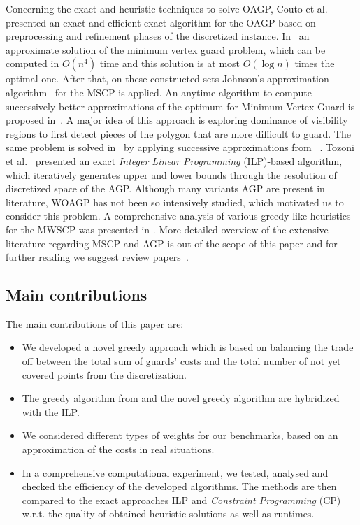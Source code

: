 \documentclass[runningheads,a4paper]{elsarticle}
\begin{document}
	Concerning the exact and heuristic techniques to solve OAGP, Couto et al.~\cite{couto2007exact} presented an exact and efficient exact algorithm for the OAGP based on preprocessing and refinement phases of the discretized instance. In~\cite{ghosh2010approximation} an approximate solution of the minimum vertex guard problem, which can be computed in $O(n^4)$ time and this solution is at most $O(\log n)$ times the optimal one. After that, on these constructed sets Johnson’s approximation algorithm~\cite{johnson1974approximation} for the MSCP is applied. An anytime algorithm to compute successively better approximations of the optimum for Minimum Vertex Guard is proposed in~\cite{tomas2003approximation}.  A major idea of this approach is exploring dominance of visibility regions to first detect pieces of the polygon that are
	more difficult to guard. The same problem is solved in~\cite{tomas2006visibility} by applying successive approximations from ~\cite{tomas2003approximation}.
	Tozoni et al.~\cite{tozoni2013practical,tozoni2016algorithm}  presented an exact \emph{Integer Linear Programming}  (ILP)-based  algorithm, which iteratively generates upper and lower bounds through the resolution of discretized space of the AGP. Although many variants AGP are present in literature, WOAGP has not been so intensively studied, which motivated us to consider this problem.  A comprehensive analysis of various greedy-like heuristics for the MWSCP  was presented in \cite{vasko2016best}.
	More detailed overview of the extensive literature regarding MSCP and AGP is out of the scope of this paper and for further reading we suggest review papers~\cite{caprara2000algorithms,ren2010new,ghosh2010approximation2}.

	
	\subsection{Main contributions}
	The main contributions of this paper are:
	\begin{itemize}
		\item We developed a novel greedy approach which is based on balancing the trade off between the total sum of guards' costs and the total number of not yet covered points from the discretization.
		\item The  greedy algorithm from \cite{chvatal1979greedy} and the novel greedy algorithm are hybridized with the ILP.
		\item We considered different types of weights for our benchmarks, based on an approximation of the costs in real situations.
		\item In a comprehensive computational experiment,  we tested, analysed and checked the efficiency of the developed algorithms. The methods are then compared to the exact approaches ILP and \emph{Constraint Programming} (CP) w.r.t. the quality of obtained heuristic solutions as well as runtimes.
	\end{itemize}
\end{document}
